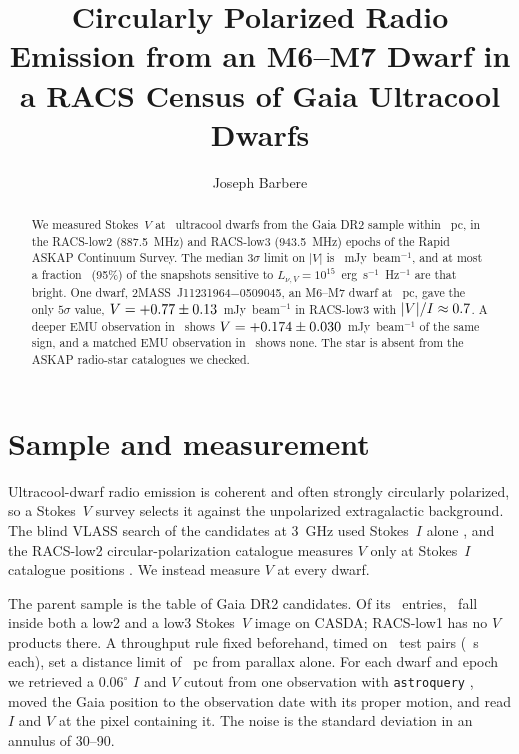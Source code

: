 \documentclass[RNAAS]{aastex631}
\newcommand{\code}[1]{\texttt{#1}}
\begin{document}
\title{Circularly Polarized Radio Emission from an M6--M7 Dwarf in a RACS Census of Gaia Ultracool Dwarfs}

\author[0009-0008-3289-4447]{Joseph Barbere}

\begin{abstract}
We measured Stokes~$V$ at \ucdvRealNCensus\ ultracool dwarfs from the
\citet{reyle2018} Gaia DR2 sample within \ucdvRealDmax~pc, in the RACS-low2 (887.5~MHz) and
RACS-low3 (943.5~MHz) epochs of the Rapid ASKAP Continuum Survey. The median $3\sigma$ limit on
$|V|$ is \ucdvRealLimit~mJy~beam$^{-1}$, and at most a fraction \ucdvRealFracFifteen\ (95\%) of the
snapshots sensitive to $L_{\nu,V}=10^{15}$~erg~s$^{-1}$~Hz$^{-1}$ are that bright. One
dwarf, 2MASS~J11231964$-$0509045, an M6--M7 dwarf at \ucdvRealDetDist~pc, gave the only
$5\sigma$ value, $V=+0.77\pm0.13$~mJy~beam$^{-1}$ in RACS-low3 with
$|V|/I\approx0.7$. A deeper EMU observation in \ucdvRealFuBestDate\ shows $V=+0.174\pm0.030$~mJy~beam$^{-1}$ of the same sign, and a
matched EMU observation in \ucdvRealFuMatchYear\ shows none. The star is absent from the ASKAP
radio-star catalogues we checked.
\end{abstract}

\section{Sample and measurement}
\label{sec:method}
Ultracool-dwarf radio emission is coherent and often strongly circularly polarized, so a
Stokes~$V$ survey selects it against the unpolarized extragalactic background. The blind
VLASS search of the \citet{reyle2018} candidates at 3~GHz used Stokes~$I$ alone
\citep{perger2025}, and the RACS-low2 circular-polarization catalogue measures $V$ only at
Stokes~$I$ catalogue positions \citep{duchesne2026}. We instead measure $V$ at every dwarf.

The parent sample is the \citet{reyle2018} table of Gaia DR2 \citep{gaiadr2} candidates.
Of its \ucdvRealNReyle\ entries, \ucdvRealNBoth\ fall inside both a low2 and a low3 Stokes~$V$
image on CASDA; RACS-low1 has no $V$ products there. A throughput rule fixed beforehand, timed on \ucdvRealSzeroN\ test pairs
(\ucdvRealSzeroSec~s each), set a distance limit of \ucdvRealDmax~pc from parallax alone. For each dwarf and epoch we retrieved a
$0.06^\circ$ $I$ and $V$ cutout from one observation \citep{mcconnell2020} with
\code{astroquery} \citep{astroquery}, moved the Gaia position to the observation date with its
proper motion, and read $I$ and $V$ at the pixel containing it. The noise is the standard
deviation in an annulus of 30--90\arcsec.
\end{document}
